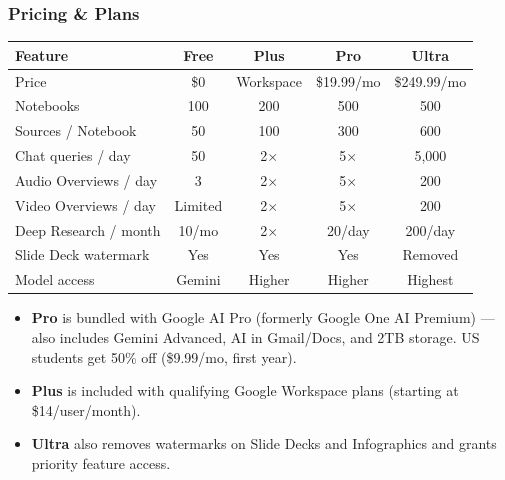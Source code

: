 \begin{frame}[fragile]\frametitle{Pricing \& Plans}
  \begin{center}
  \begin{tabular}{|l|c|c|c|c|}
    \hline
    \textbf{Feature} & \textbf{Free} & \textbf{Plus} & \textbf{Pro} & \textbf{Ultra} \\
    \hline
    Price & \$0 & Workspace & \$19.99/mo & \$249.99/mo \\
    Notebooks & 100 & 200 & 500 & 500 \\
    Sources / Notebook & 50 & 100 & 300 & 600 \\
    Chat queries / day & 50 & 2$\times$ & 5$\times$ & 5,000 \\
    Audio Overviews / day & 3 & 2$\times$ & 5$\times$ & 200 \\
    Video Overviews / day & Limited & 2$\times$ & 5$\times$ & 200 \\
    Deep Research / month & 10/mo & 2$\times$ & 20/day & 200/day \\
    Slide Deck watermark & Yes & Yes & Yes & Removed \\
    Model access & Gemini & Higher & Higher & Highest \\
    \hline
  \end{tabular}
  \end{center}
  \vspace{0.3em}
  \begin{itemize}
    \item \textbf{Pro} is bundled with Google AI Pro (formerly Google One AI Premium) — also includes Gemini Advanced, AI in Gmail/Docs, and 2TB storage. US students get 50\% off (\$9.99/mo, first year).
    \item \textbf{Plus} is included with qualifying Google Workspace plans (starting at \$14/user/month).
    \item \textbf{Ultra} also removes watermarks on Slide Decks and Infographics and grants priority feature access.
  \end{itemize}
\end{frame}

